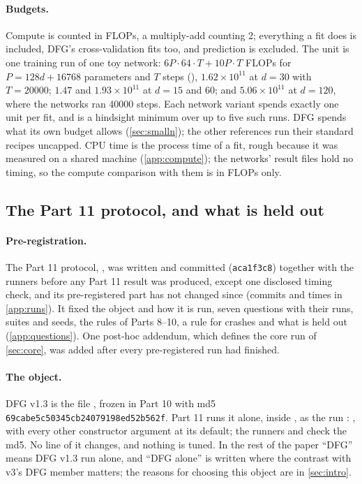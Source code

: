 \paragraph{Budgets.} Compute is counted in FLOPs, a multiply-add counting 2; everything a fit does is included, DFG's cross-validation fits too, and prediction is excluded. The unit is one training run of one toy network: $6P\cdot64\cdot T+10P\cdot T$ FLOPs for $P=128d+16768$ parameters and $T$ steps (), $1.62\times10^{11}$ at $d=30$ with $T=20000$; $1.47$ and $1.93\times10^{11}$ at $d=15$ and 60; and $5.06\times10^{11}$ at $d=120$, where the networks ran 40000 steps. Each network variant spends exactly one unit per fit, and  is a hindsight minimum over up to five such runs. DFG spends what its own budget allows (\cref{sec:smalln}); the other references run their standard recipes uncapped. CPU time is the process time of a fit, rough because it was measured on a shared machine (\cref{app:compute}); the networks' result files hold no timing, so the compute comparison with them is in FLOPs only.

\subsection{The Part 11 protocol, and what is held out}\label{sec:part11}

\paragraph{Pre-registration.} The Part 11 protocol, , was written and committed (\texttt{aca1f3c8}) together with the runners before any Part 11 result was produced, except one disclosed timing check, and its pre-registered part has not changed since (commits and times in \cref{app:runs}). It fixed the object and how it is run, seven questions with their runs, suites and seeds, the rules of Parts 8--10, a rule for crashes and what is held out (\cref{app:questions}). One post-hoc addendum, which defines the core run of \cref{sec:core}, was added after every pre-registered run had finished.

\paragraph{The object.} DFG v1.3 is the file , frozen in Part 10 with md5 \texttt{69cabe5c50345cb24079198ed52b562f}. Part 11 runs it alone, inside , as the run : , with every other constructor argument at its default; the runners  and  check the md5. No line of it changes, and nothing is tuned. In the rest of the paper ``DFG'' means DFG v1.3 run alone, and ``DFG alone'' is written where the contrast with v3's DFG member matters; the reasons for choosing this object are in \cref{sec:intro}.

